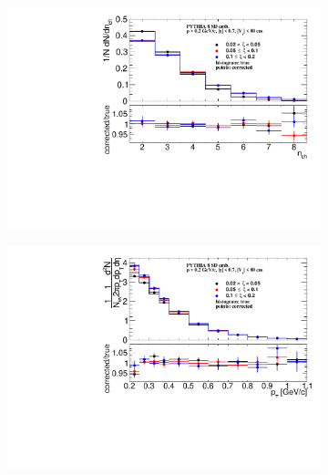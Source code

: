 \begin{figure}[h!]
	\centering
	\begin{subfigure}{.49\textwidth}
		\includegraphics[width=\textwidth,page=1]{chapters/chrgSTAR/img/closure/nch_test.pdf}
	\end{subfigure}
	\begin{subfigure}{.49\textwidth}
		\includegraphics[width=\textwidth,page=1]{chapters/chrgSTAR/img/closure/pt_test.pdf}
	\end{subfigure}
	\begin{subfigure}{.49\textwidth}

\end{subfigure}
\end{figure}
